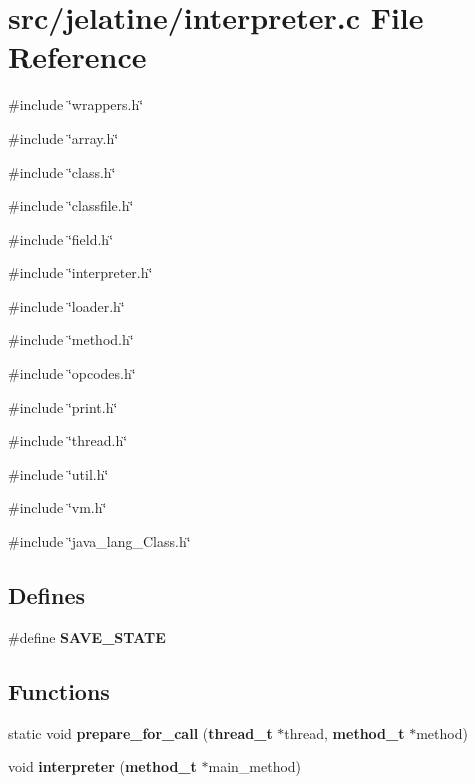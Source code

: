 \section{src/jelatine/interpreter.c File Reference}
\label{interpreter_8c}
{\ttfamily \#include \char`\"{}wrappers.h\char`\"{}}\par
{\ttfamily \#include \char`\"{}array.h\char`\"{}}\par
{\ttfamily \#include \char`\"{}class.h\char`\"{}}\par
{\ttfamily \#include \char`\"{}classfile.h\char`\"{}}\par
{\ttfamily \#include \char`\"{}field.h\char`\"{}}\par
{\ttfamily \#include \char`\"{}interpreter.h\char`\"{}}\par
{\ttfamily \#include \char`\"{}loader.h\char`\"{}}\par
{\ttfamily \#include \char`\"{}method.h\char`\"{}}\par
{\ttfamily \#include \char`\"{}opcodes.h\char`\"{}}\par
{\ttfamily \#include \char`\"{}print.h\char`\"{}}\par
{\ttfamily \#include \char`\"{}thread.h\char`\"{}}\par
{\ttfamily \#include \char`\"{}util.h\char`\"{}}\par
{\ttfamily \#include \char`\"{}vm.h\char`\"{}}\par
{\ttfamily \#include \char`\"{}java\_\-lang\_\-Class.h\char`\"{}}\par
\subsection*{Defines}
\begin{DoxyCompactItemize}
\item 
\#define {\bf SAVE\_\-STATE}
\end{DoxyCompactItemize}
\subsection*{Functions}
\begin{DoxyCompactItemize}
\item 
static void {\bf prepare\_\-for\_\-call} ({\bf thread\_\-t} $\ast$thread, {\bf method\_\-t} $\ast$method)
\item 
void {\bf interpreter} ({\bf method\_\-t} $\ast$main\_\-method)
\end{DoxyCompactItemize}


